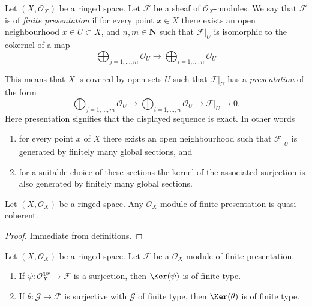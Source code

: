 \begin{definition}
\label{definition-finite-presentation}
Let $(X, \mathcal{O}_X)$ be a ringed space.
Let $\mathcal{F}$ be a sheaf of $\mathcal{O}_X$-modules.
We say that $\mathcal{F}$ is of {\it finite presentation}
if for every point $x \in X$ there exists an open neighbourhood
$x\in U \subset X$, and  $n, m \in \mathbf{N}$ such that $\mathcal{F}|_U$
is isomorphic to the cokernel of a map
$$
\bigoplus\nolimits_{j = 1, \ldots, m}
\mathcal{O}_U
\longrightarrow
\bigoplus\nolimits_{i = 1, \ldots, n}
\mathcal{O}_U
$$
\end{definition}

\noindent
This means that $X$ is covered by open sets $U$
such that $\mathcal{F}|_U$ has a {\it presentation}
of the form
$$
\bigoplus\nolimits_{j = 1, \ldots, m}
\mathcal{O}_U
\longrightarrow
\bigoplus\nolimits_{i = 1, \ldots, n}
\mathcal{O}_U
\to
\mathcal{F}|_U
\to
0.
$$
Here presentation signifies that the displayed
sequence is exact. In other words
\begin{enumerate}
\item for every point $x$ of $X$ there exists
an open neighbourhood such that $\mathcal{F}|_U$
is generated by finitely many global sections, and
\item for a suitable choice of these sections
the kernel of the associated surjection is also
generated by finitely many global sections.
\end{enumerate}

\begin{lemma}
\label{lemma-finite-presentation-quasi-coherent}
Let $(X, \mathcal{O}_X)$ be a ringed space.
Any $\mathcal{O}_X$-module of finite presentation
is quasi-coherent.
\end{lemma}

\begin{proof}
Immediate from definitions.
\end{proof}

\begin{lemma}
\label{lemma-kernel-surjection-finite-free-onto-finite-presentation}
Let $(X, \mathcal{O}_X)$ be a ringed space.
Let $\mathcal{F}$ be a $\mathcal{O}_X$-module of finite presentation.
\begin{enumerate}
\item If $\psi : \mathcal{O}_X^{\oplus r} \to \mathcal{F}$ is a surjection,
then $\Ker(\psi)$ is of finite type.
\item If $\theta : \mathcal{G} \to \mathcal{F}$ is surjective with
$\mathcal{G}$ of finite type, then $\Ker(\theta)$ is of finite type.
\end{enumerate}
\end{lemma}

